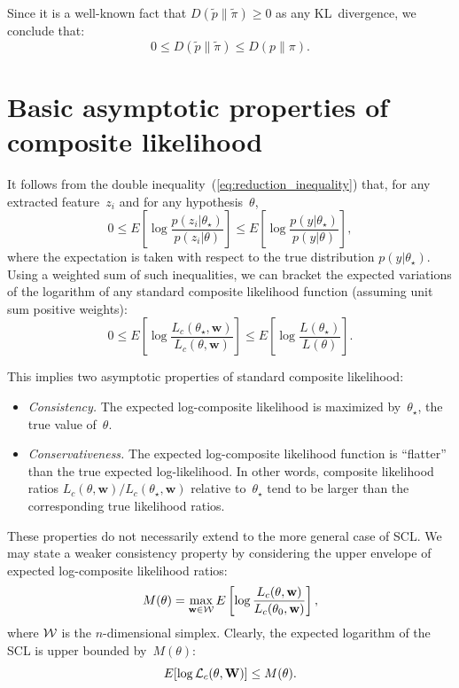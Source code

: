 \documentclass[english]{scrartcl}
\begin{document}
Since it is a well-known fact that $D(\tilde{p}\|\tilde{\pi})\geq 0$ as any KL~divergence, we conclude that:
\begin{equation}
\label{eq:reduction_inequality}
0 
\leq D(\tilde{p}\|\tilde{\pi}) 
\leq D(p\|\pi)
.
\end{equation}


\section{Basic asymptotic properties of composite likelihood}
\label{sec:asymptotic}

It follows from the double inequality~(\ref{eq:reduction_inequality}) that, for any extracted feature~$z_i$ and for any hypothesis~$\theta$,
$$
0 \leq
E\left[
\log \frac{p(z_i|\theta_\star)}{p(z_i|\theta)}
\right]
\leq
E\left[
\log \frac{p(y|\theta_\star)}{p(y|\theta)}
\right],
$$
where the expectation is taken with respect to the true distribution $p(y|\theta_\star)$. Using a weighted sum of such inequalities, we can bracket the expected variations of the logarithm of any standard composite likelihood function (assuming unit sum positive weights):
\begin{equation}
\label{eq:variation_bound}
0 \leq
E\left[ \log \frac{L_c(\theta_\star, \mathbf{w})}{L_c(\theta, \mathbf{w})} \right]
\leq 
E\left[ \log \frac{L(\theta_\star)}{L(\theta)} \right]
.
\end{equation}

This implies two asymptotic properties of standard composite likelihood: 
\begin{itemize}
\item {\em Consistency.} The expected log-composite likelihood is maximized by~$\theta_\star$, the true value of~$\theta$.
\item {\em Conservativeness.} The expected log-composite likelihood function is ``flatter'' than the true expected log-likelihood. In other words, composite likelihood ratios $L_c(\theta, \mathbf{w})/L_c(\theta_\star, \mathbf{w})$ relative to~$\theta_\star$ tend to be larger than the corresponding true likelihood ratios. 
\end{itemize}

These properties do not necessarily extend to the more general case of SCL. We may state a weaker consistency property by considering the upper envelope of expected log-composite likelihood ratios:
$$
M(\theta) = \max_{\mathbf{w}\in{\cal W}} E\left[ \log \frac{L_c(\theta, \mathbf{w})}{L_c(\theta_0, \mathbf{w})} \right],
$$
where ${\cal W}$ is the $n$-dimensional simplex. Clearly, the expected logarithm of the SCL is upper bounded by~$M(\theta)$:
$$
E[\log {\cal L}_c(\theta, \mathbf{W})] \leq M(\theta)
.
$$
\end{document}
